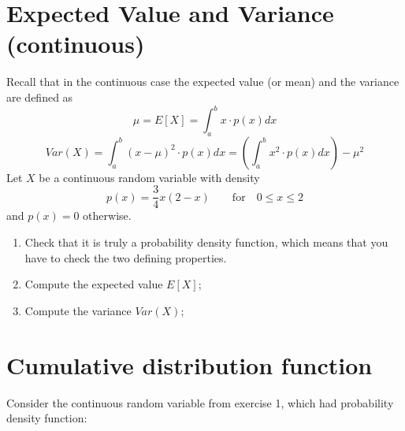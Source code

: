 \documentclass[10pt]{article}
\begin{document}
\section{Expected Value and Variance (continuous)}
Recall that in the continuous case the expected value (or mean) and the variance are defined as
\[
\mu=E[X]=\int_a^b x \cdot p(x) dx
\]
\[
Var(X)=\int_a^b(x-\mu)^2 \cdot p(x) dx=\left( \int_a^b x^2 \cdot p(x) dx \right) -\mu^2
\]
Let $X$ be a continuous random variable with density
\[
p(x)=\frac{3}{4}x(2-x) \qquad \text{for} \quad  0 \leq x \leq 2
\]
and $p(x)=0$ otherwise.
\begin{enumerate}
    \item Check that it is truly a probability density function, which means that you have to check the two defining properties.
    \item Compute the expected value $E[X]$;
    \item Compute the variance $Var(X)$;
\end{enumerate}

\newpage 
\section{Cumulative distribution function}
Consider the continuous random variable from exercise 1, which had probability density function:
\\ 
\end{document}
